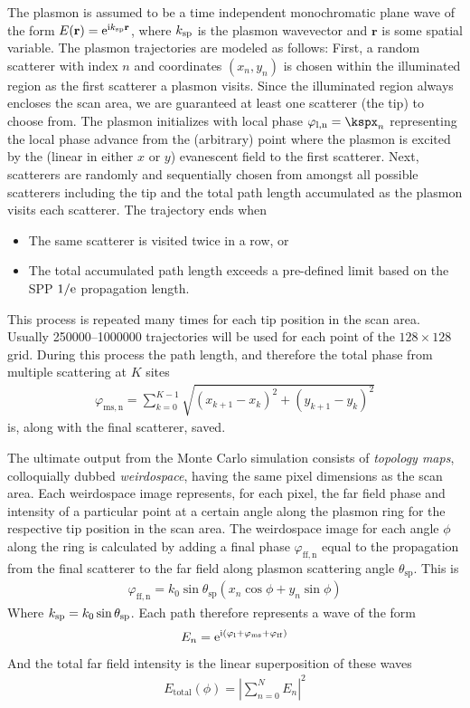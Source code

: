 The plasmon is assumed to be a time independent monochromatic plane wave
of the form $E(\mathbf{r})={\mathrm{e}}^{{\mathrm{i}} k_\mathrm{sp}\mathbf{r}}$, where
$k_\mathrm{sp}$ is the plasmon wavevector and $\mathbf{r}$ is some
spatial variable.  The plasmon trajectories are modeled as follows:
First, a random scatterer with index $n$ and coordinates $(x_n,y_n)$ is
chosen within the illuminated region as the first scatterer a plasmon
visits.  Since the illuminated region always encloses the scan area, we are
guaranteed at least one scatterer (the tip) to choose from.  The plasmon
initializes with local phase $\varphi_\mathrm{l,n}=\kspx_n$
representing the local phase advance from the (arbitrary) point where the
plasmon is excited by the (linear in either $x$ or $y$) evanescent field to
the first scatterer.  Next, scatterers are randomly and sequentially chosen
from amongst all possible scatterers including the tip and the total path
length accumulated as the plasmon visits each scatterer.  The trajectory
ends when
\begin{itemize}
\item The same scatterer is visited twice in a row, or
\item The total accumulated path length exceeds a pre-defined limit based
				on the SPP $1/{\mathrm{e}}$ propagation length.  
\end{itemize}
This process is repeated many times for each tip position in the scan area.
Usually \numrange{250000}{1000000} trajectories will be used for each point
of the $128\times128$ grid.  During this process the path length, and
therefore the total phase from multiple scattering at $K$ sites
\begin{align}
\varphi_\mathrm{ms,n}=\sum_{k=0}^{K-1} \sqrt{(x_{k+1}-x_k)^2+(y_{k+1}-y_k)^2}
\end{align}
is, along with the final scatterer, saved.

The ultimate output from the Monte Carlo simulation consists of {\it
topology maps}, colloquially dubbed {\it weirdospace}, having the same pixel
dimensions as the scan area.  Each weirdospace image represents, for each
pixel, the far field phase and intensity of a particular point at a certain
angle along the plasmon ring for the respective tip position in the scan
area.  The weirdospace image for each angle $\phi$ along the ring is
calculated by adding a final phase $\varphi_\mathrm{ff,n}$ equal to the
propagation from the final scatterer to the far field along plasmon
scattering angle $\theta_\mathrm{sp}$.  This is 
\begin{align}
\varphi_\mathrm{ff,n} = k_0 \sin
\theta_\mathrm{sp}\left(x_n\cos\phi+y_n\sin\phi\right)
\end{align}
Where $k_\mathrm{sp}=k_0\sin \theta_\mathrm{sp}$.  Each path therefore
represents a wave of the form
\begin{align}
E_n={\mathrm{e}}^{{\mathrm{i}}(\varphi_\mathrm{l}+\varphi_\mathrm{ms}+\varphi_\mathrm{ff})}
\end{align}
And the total far field intensity is the linear superposition of these
waves
\begin{align}
E_\mathrm{total}(\phi) = 
\left|\sum_{n=0}^{N} E_n\right|^2
\end{align}

